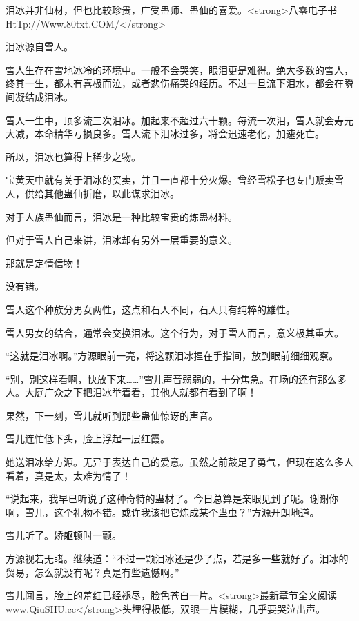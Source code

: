 
\begin{this_body}

泪冰并非仙材，但也比较珍贵，广受蛊师、蛊仙的喜爱。<strong>八零电子书HtTp://Www.80txt.COM/</strong>

泪冰源自雪人。

雪人生存在雪地冰冷的环境中。一般不会哭笑，眼泪更是难得。绝大多数的雪人，终其一生，都未有喜极而泣，或者悲伤痛哭的经历。不过一旦流下泪水，都会在瞬间凝结成泪冰。

雪人一生中，顶多流三次泪冰。加起来不超过六十颗。每流一次泪，雪人就会寿元大减，本命精华亏损良多。雪人流下泪冰过多，将会迅速老化，加速死亡。

所以，泪冰也算得上稀少之物。

宝黄天中就有关于泪冰的买卖，并且一直都十分火爆。曾经雪松子也专门贩卖雪人，供给其他蛊仙折磨，以此谋求泪冰。

对于人族蛊仙而言，泪冰是一种比较宝贵的炼蛊材料。

但对于雪人自己来讲，泪冰却有另外一层重要的意义。

那就是定情信物！

没有错。

雪人这个种族分男女两性，这点和石人不同，石人只有纯粹的雄性。

雪人男女的结合，通常会交换泪冰。这个行为，对于雪人而言，意义极其重大。

“这就是泪冰啊。”方源眼前一亮，将这颗泪冰捏在手指间，放到眼前细细观察。

“别，别这样看啊，快放下来……”雪儿声音弱弱的，十分焦急。在场的还有那么多人。大庭广众之下把泪冰举着看，其他人就都有看到了啊！

果然，下一刻，雪儿就听到那些蛊仙惊讶的声音。

雪儿连忙低下头，脸上浮起一层红霞。

她送泪冰给方源。无异于表达自己的爱意。虽然之前鼓足了勇气，但现在这么多人看着，真是太，太难为情了！

“说起来，我早已听说了这种奇特的蛊材了。今日总算是亲眼见到了呢。谢谢你啊，雪儿，这个礼物不错。或许我该把它炼成某个蛊虫？”方源开朗地道。

雪儿听了。娇躯顿时一颤。

方源视若无睹。继续道：“不过一颗泪冰还是少了点，若是多一些就好了。泪冰的贸易，怎么就没有呢？真是有些遗憾啊。”

雪儿闻言，脸上的羞红已经褪尽，脸色苍白一片。<strong>最新章节全文阅读www.QiuSHU.cc</strong>头埋得极低，双眼一片模糊，几乎要哭泣出声。


\end{this_body}
